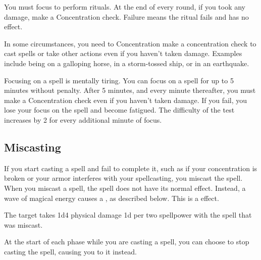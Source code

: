          You must focus to perform rituals.
        At the end of every round, if you took any damage, make a Concentration check.
        Failure means the ritual fails and has no effect.

         In some circumstances, you need to Concentration make a concentration check to cast spells or take other actions even if you haven't taken damage.
        Examples include being on a galloping horse, in a storm-tossed ship, or in an earthquake.

         Focusing on a spell is mentally tiring.
        You can focus on a spell for up to 5 minutes without penalty.
        After 5 minutes, and every minute thereafter, you must make a Concentration check even if you haven't taken damage.
        If you fail, you lose your focus on the spell and become fatigued.
        The difficulty of the test increases by 2 for every additional minute of focus.

    \subsection{Miscasting}\label{Miscasting}

        If you start casting a spell and fail to complete it, such as if your concentration is broken or your armor interferes with your spellcasting, you miscast the spell.
        When you miscast a spell, the spell does not have its normal effect.
        Instead, a wave of magical energy causes a , as described below.
        This is a  effect.
        \begin{ability}
            \begin{spelltargetinginfo}
            \end{spelltargetinginfo}
            \begin{spelleffects}
                \spelleffect The target takes 1d4 physical damage \plus1d per two spellpower with the spell that was miscast.
            \end{spelleffects}
        \end{ability}

        At the start of each phase while you are casting a spell, you can choose to stop casting the spell, causing you to  it instead.

